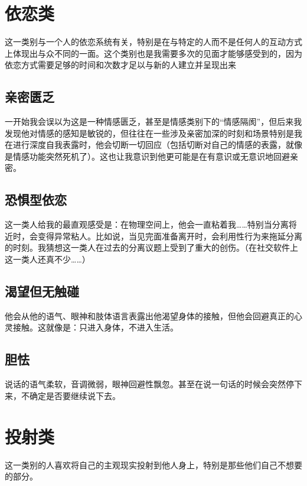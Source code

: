 \section*{依恋类}

这一类别与一个人的依恋系统有关，特别是在与特定的人而不是任何人的互动方式上体现出与众不同的一面。这个类别也是我需要多次的见面才能够感受到的，因为依恋方式需要足够的时间和次数才足以与新的人建立并呈现出来

\subsection*{亲密匮乏}

一开始我会误以为这是一种情感匮乏，甚至是情感类别下的“情感隔阂”，但后来我发现他对情感的感知是敏锐的，但往往在一些涉及亲密加深的时刻和场景\pozhehao{}特别是我在进行深度自我表露\pozhehao{}时，他会切断一切回应（包括切断对自己的情感的表露，就像是情感功能突然死机了）。这也让我意识到他更可能是在有意识或无意识地回避亲密。

\subsection*{恐惧型依恋}

这一类人给我的最直观感受是：在物理空间上，他会一直粘着我……特别当分离将近时，会变得异常粘人。比如说，当见完面准备离开时，会利用性行为来拖延分离的时刻。我猜想这一类人在过去的分离议题上受到了重大的创伤。（在社交软件上这一类人还真不少……）

\subsection*{渴望但无触碰}

他会从他的语气、眼神和肢体语言表露出他渴望身体的接触，但他会回避真正的心灵接触。这就像是：只进入身体，不进入生活。

\subsection*{胆怯}

说话的语气柔软，音调微弱，眼神回避性飘忽。甚至在说一句话的时候会突然停下来，不确定是否要继续说下去。


\section*{投射类}

这一类别的人喜欢将自己的主观现实投射到他人身上，特别是那些他们自己不想要的部分。

